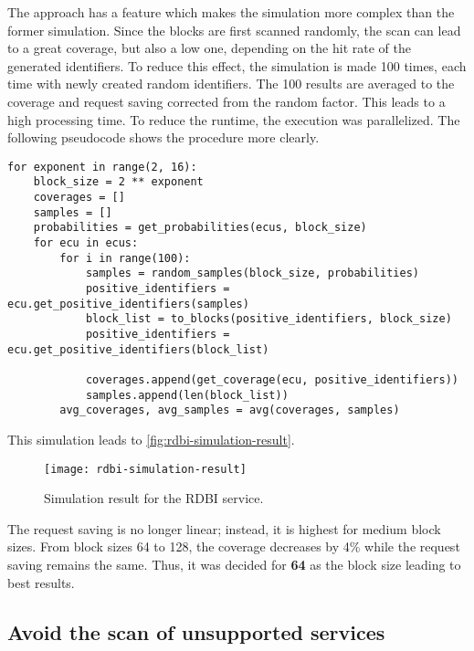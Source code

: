The approach has a feature which makes the simulation more complex than the former simulation. Since the blocks are first scanned randomly, the scan can lead to a great coverage, but also a low one, depending on the hit rate of the generated identifiers. To reduce this effect, the simulation is made 100 times, each time with newly created random identifiers. The 100 results are averaged to the coverage and request saving corrected from the random factor. This leads to a high processing time. To reduce the runtime, the execution was parallelized.
The following pseudocode shows the procedure more clearly.

\begin{samepage}
\begin{verbatim}
for exponent in range(2, 16):
    block_size = 2 ** exponent
    coverages = []
    samples = []
    probabilities = get_probabilities(ecus, block_size)
    for ecu in ecus:
        for i in range(100):
            samples = random_samples(block_size, probabilities)
            positive_identifiers = ecu.get_positive_identifiers(samples)
            block_list = to_blocks(positive_identifiers, block_size)
            positive_identifiers = ecu.get_positive_identifiers(block_list)

            coverages.append(get_coverage(ecu, positive_identifiers))
            samples.append(len(block_list))
        avg_coverages, avg_samples = avg(coverages, samples)
\end{verbatim}
\end{samepage}

This simulation leads to \autoref{fig:rdbi-simulation-result}.

\begin{figure}[h]
    \centering
    \texttt{[image: rdbi-simulation-result]}
    \caption{Simulation result for the RDBI service.}
    \label{fig:rdbi-simulation-result}
\end{figure}

The request saving is no longer linear; instead, it is highest for medium block sizes. From block sizes 64 to 128, the coverage decreases by 4\% while the request saving remains the same. Thus, it was decided for \textbf{64} as the block size leading to best results.


\subsection{Avoid the scan of unsupported services}
\label{subsec:unsupported-services-elaboration}

